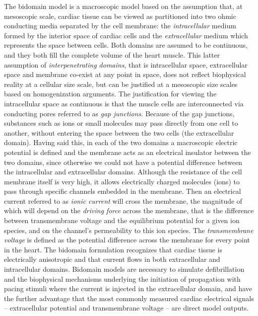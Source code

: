 \documentclass[10pt]{article}
\begin{document}
	The bidomain model is a macroscopic model based on the assumption that, at mesoscopic scale, cardiac
	tissue can be viewed as partitioned into two ohmic conducting media separated by the cell membrane: the
	{\it intracellular} medium formed by the interior space of cardiac cells and the {\it extracellular} medium
	which represents the space between cells. Both domains are assumed to be continuous, and they both fill
	the complete volume of the heart muscle. This latter assumption of \emph{interpenetrating domains}, that
	is intracellular space, extracellular space and membrane co-exist at any point in space, does not reflect
	biophysical reality at a cellular size scale, but can be justified at a mesoscopic size scales based on homogenization
	arguments. The justification for viewing the intracellular space as continuous is that the muscle
	cells are interconnected via conducting pores referred to as {\it gap junctions}. Because of the gap junctions,
	substances such as ions or small molecules may pass directly from one cell to another, without entering the space
	between the two cells (the extracellular domain). Having said this, in each of the two domains a macroscopic
	electric potential is defined and the membrane acts as an electrical insulator between the two domains,
	since otherwise we could not have a potential difference between the intracellular and extracellular domains.
	Although the resistance of the cell membrane itself is very high, it allows electrically charged molecules (ions)
	to pass through specific channels embedded in the membrane. Then an electrical current referred to as
	\emph{ionic current} will cross the membrane, the magnitude of which will depend on the \emph{driving
	force} across the membrane, that is the difference between transmembrane voltage and the equilibrium potential
	for a given ion species, and on the channel's permeability to this ion species. The {\it transmembrane
	voltage} is defined as the potential difference across the membrane for every point in the heart. The bidomain
	formulation recognizes that cardiac tissue is electrically anisotropic and that current flows in both extracellular
	and intracellular domains. Bidomain models are necessary to simulate defibrillation and the biophysical
	mechanisms underlying the initiation of propagation with pacing stimuli where the current is injected in the
	extracellular domain, and have the further advantage that the most commonly measured cardiac electrical signals
	-- extracellular potential and transmembrane voltage -- are direct model outputs.
\end{document}

